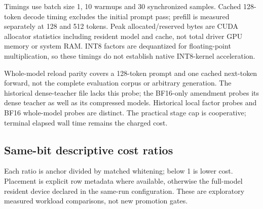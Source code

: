\documentclass[10pt]{article}
\begin{document}
Timings use batch size 1, 10 warmups and 30 synchronized samples. Cached 128-token decode timing excludes the initial prompt pass; prefill is measured separately at 128 and 512 tokens. Peak allocated/reserved bytes are CUDA allocator statistics including resident model and cache, not total driver GPU memory or system RAM. INT8 factors are dequantized for floating-point multiplication, so these timings do not establish native INT8-kernel acceleration.

Whole-model reload parity covers a 128-token prompt and one cached next-token forward, not the complete evaluation corpus or arbitrary generation. The historical dense-teacher file lacks this probe; the BF16-only amendment probes its dense teacher as well as its compressed models. Historical local factor probes and BF16 whole-model probes are distinct. The practical stage cap is cooperative; terminal elapsed wall time remains the charged cost.

\subsection{Same-bit descriptive cost ratios}

Each ratio is anchor divided by matched whitening; below 1 is lower cost. Placement is explicit row metadata where available, otherwise the full-model resident device declared in the same-run configuration. These are exploratory measured workload comparisons, not new promotion gates.
\end{document}
